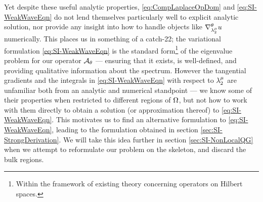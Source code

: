 Yet despite these useful analytic properties, \eqref{eq:CompLaplaceOpDom} and \eqref{eq:SI-WeakWaveEqn} do not lend themselves particularly well to explicit analytic solution, nor provide any insight into how to handle objects like $\nabla^{\theta}_{\lambda_2^{\mu}}u$ numerically.
This places us in something of a catch-22; the variational formulation \eqref{eq:SI-WeakWaveEqn} is the standard form\footnote{Within the framework of existing theory concerning operators on Hilbert spaces.} of the eigenvalue problem for our operator $\mathcal{A}_{\theta}$ --- ensuring that it exists, is well-defined, and providing qualitative information about the spectrum.
However the tangential gradients and the integrals in \eqref{eq:SI-WeakWaveEqn} with respect to $\lambda_2^{\mu}$ are unfamiliar both from an analytic and numerical standpoint --- we know some of their properties when restricted to different regions of $\Omega$, but not how to work with them directly to obtain a solution (or approximation thereof) to \eqref{eq:SI-WeakWaveEqn}.
This motivates us to find an alternative formulation to \eqref{eq:SI-WeakWaveEqn}, leading to the formulation obtained in section \ref{sec:SI-StrongDerivation}.
We will take this idea further in section \ref{sec:SI-NonLocalQG} when we attempt to reformulate our problem on the skeleton, and discard the bulk regions.

